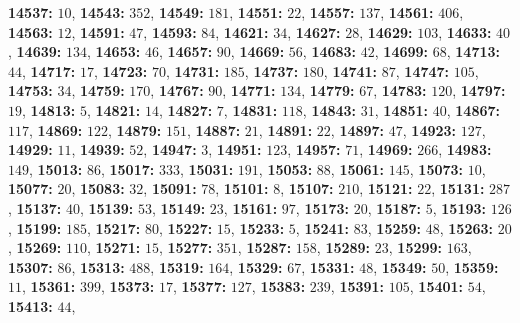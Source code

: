 \textsf{\bfseries 14537:} $10$, \textsf{\bfseries 14543:} $352$, \textsf{\bfseries 14549:} $181$, \textsf{\bfseries 14551:} $22$, \textsf{\bfseries 14557:} $137$, \textsf{\bfseries 14561:} $406$, \textsf{\bfseries 14563:} $12$, \textsf{\bfseries 14591:} $47$, \textsf{\bfseries 14593:} $84$, \textsf{\bfseries 14621:} $34$, \textsf{\bfseries 14627:} $28$, \textsf{\bfseries 14629:} $103$, \textsf{\bfseries 14633:} $40$, \textsf{\bfseries 14639:} $134$, \textsf{\bfseries 14653:} $46$, \textsf{\bfseries 14657:} $90$, \textsf{\bfseries 14669:} $56$, \textsf{\bfseries 14683:} $42$, \textsf{\bfseries 14699:} $68$, \textsf{\bfseries 14713:} $44$, \textsf{\bfseries 14717:} $17$, \textsf{\bfseries 14723:} $70$, \textsf{\bfseries 14731:} $185$, \textsf{\bfseries 14737:} $180$, \textsf{\bfseries 14741:} $87$, \textsf{\bfseries 14747:} $105$, \textsf{\bfseries 14753:} $34$, \textsf{\bfseries 14759:} $170$, \textsf{\bfseries 14767:} $90$, \textsf{\bfseries 14771:} $134$, \textsf{\bfseries 14779:} $67$, \textsf{\bfseries 14783:} $120$, \textsf{\bfseries 14797:} $19$, \textsf{\bfseries 14813:} $5$, \textsf{\bfseries 14821:} $14$, \textsf{\bfseries 14827:} $7$, \textsf{\bfseries 14831:} $118$, \textsf{\bfseries 14843:} $31$, \textsf{\bfseries 14851:} $40$, \textsf{\bfseries 14867:} $117$, \textsf{\bfseries 14869:} $122$, \textsf{\bfseries 14879:} $151$, \textsf{\bfseries 14887:} $21$, \textsf{\bfseries 14891:} $22$, \textsf{\bfseries 14897:} $47$, \textsf{\bfseries 14923:} $127$, \textsf{\bfseries 14929:} $11$, \textsf{\bfseries 14939:} $52$, \textsf{\bfseries 14947:} $3$, \textsf{\bfseries 14951:} $123$, \textsf{\bfseries 14957:} $71$, \textsf{\bfseries 14969:} $266$, \textsf{\bfseries 14983:} $149$, \textsf{\bfseries 15013:} $86$, \textsf{\bfseries 15017:} $333$, \textsf{\bfseries 15031:} $191$, \textsf{\bfseries 15053:} $88$, \textsf{\bfseries 15061:} $145$, \textsf{\bfseries 15073:} $10$, \textsf{\bfseries 15077:} $20$, \textsf{\bfseries 15083:} $32$, \textsf{\bfseries 15091:} $78$, \textsf{\bfseries 15101:} $8$, \textsf{\bfseries 15107:} $210$, \textsf{\bfseries 15121:} $22$, \textsf{\bfseries 15131:} $287$, \textsf{\bfseries 15137:} $40$, \textsf{\bfseries 15139:} $53$, \textsf{\bfseries 15149:} $23$, \textsf{\bfseries 15161:} $97$, \textsf{\bfseries 15173:} $20$, \textsf{\bfseries 15187:} $5$, \textsf{\bfseries 15193:} $126$, \textsf{\bfseries 15199:} $185$, \textsf{\bfseries 15217:} $80$, \textsf{\bfseries 15227:} $15$, \textsf{\bfseries 15233:} $5$, \textsf{\bfseries 15241:} $83$, \textsf{\bfseries 15259:} $48$, \textsf{\bfseries 15263:} $20$, \textsf{\bfseries 15269:} $110$, \textsf{\bfseries 15271:} $15$, \textsf{\bfseries 15277:} $351$, \textsf{\bfseries 15287:} $158$, \textsf{\bfseries 15289:} $23$, \textsf{\bfseries 15299:} $163$, \textsf{\bfseries 15307:} $86$, \textsf{\bfseries 15313:} $488$, \textsf{\bfseries 15319:} $164$, \textsf{\bfseries 15329:} $67$, \textsf{\bfseries 15331:} $48$, \textsf{\bfseries 15349:} $50$, \textsf{\bfseries 15359:} $11$, \textsf{\bfseries 15361:} $399$, \textsf{\bfseries 15373:} $17$, \textsf{\bfseries 15377:} $127$, \textsf{\bfseries 15383:} $239$, \textsf{\bfseries 15391:} $105$, \textsf{\bfseries 15401:} $54$, \textsf{\bfseries 15413:} $44$, 
